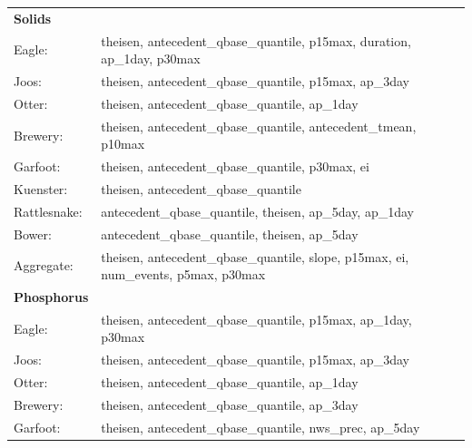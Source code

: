 \documentclass[10pt]{article}
\begin{document}
\begin{table}[h!]\small
    \begin{center}
    \begin{tabular}{ll}
        \textbf{Solids} & \\
        \hspace{5mm} Eagle: & theisen, antecedent\_qbase\_quantile, p15max, duration, ap\_1day, p30max\\
        \hspace{5mm} Joos: & theisen, antecedent\_qbase\_quantile, p15max, ap\_3day\\
        \hspace{5mm} Otter: & theisen, antecedent\_qbase\_quantile, ap\_1day\\
        \hspace{5mm} Brewery: & theisen, antecedent\_qbase\_quantile, antecedent\_tmean, p10max\\
        \hspace{5mm} Garfoot: & theisen, antecedent\_qbase\_quantile, p30max, ei\\
        \hspace{5mm} Kuenster: & theisen, antecedent\_qbase\_quantile\\
        \hspace{5mm} Rattlesnake: & antecedent\_qbase\_quantile, theisen, ap\_5day, ap\_1day \\
        \hspace{5mm} Bower: & antecedent\_qbase\_quantile, theisen, ap\_5day\\
        \hspace{5mm} Aggregate: & theisen, antecedent\_qbase\_quantile, slope, p15max, ei, num\_events, p5max, p30max
    \vspace{2mm}\\
        \textbf{Phosphorus} & \\
        \hspace{5mm} Eagle: & theisen, antecedent\_qbase\_quantile, p15max, ap\_1day, p30max\\
        \hspace{5mm} Joos: & theisen, antecedent\_qbase\_quantile, p15max, ap\_3day\\
        \hspace{5mm} Otter: & theisen, antecedent\_qbase\_quantile, ap\_1day\\
        \hspace{5mm} Brewery: & theisen, antecedent\_qbase\_quantile, ap\_3day\\
        \hspace{5mm} Garfoot: & theisen, antecedent\_qbase\_quantile, nws\_prec, ap\_5day\\

\end{tabular}
\end{center}
\end{table}
\end{document}
